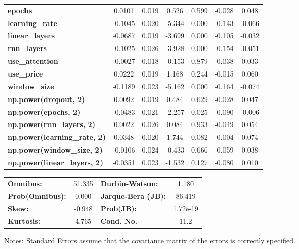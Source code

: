 \begin{center}
\begin{tabular}{lcccccc}
\textbf{epochs}                            &       0.0101  &        0.019     &     0.526  &         0.599        &       -0.028    &        0.048     \\
\textbf{learning\_rate}                    &      -0.1045  &        0.020     &    -5.344  &         0.000        &       -0.143    &       -0.066     \\
\textbf{linear\_layers}                    &      -0.0687  &        0.019     &    -3.699  &         0.000        &       -0.105    &       -0.032     \\
\textbf{rnn\_layers}                       &      -0.1025  &        0.026     &    -3.928  &         0.000        &       -0.154    &       -0.051     \\
\textbf{use\_attention}                    &      -0.0027  &        0.018     &    -0.153  &         0.879        &       -0.038    &        0.033     \\
\textbf{use\_price}                        &       0.0222  &        0.019     &     1.168  &         0.244        &       -0.015    &        0.060     \\
\textbf{window\_size}                      &      -0.1189  &        0.023     &    -5.162  &         0.000        &       -0.164    &       -0.074     \\
\textbf{np.power(dropout, 2)}              &       0.0092  &        0.019     &     0.484  &         0.629        &       -0.028    &        0.047     \\
\textbf{np.power(epochs, 2)}               &      -0.0483  &        0.021     &    -2.257  &         0.025        &       -0.090    &       -0.006     \\
\textbf{np.power(rnn\_layers, 2)}          &       0.0022  &        0.026     &     0.084  &         0.933        &       -0.049    &        0.054     \\
\textbf{np.power(learning\_rate, 2)}       &       0.0348  &        0.020     &     1.744  &         0.082        &       -0.004    &        0.074     \\
\textbf{np.power(window\_size, 2)}         &      -0.0106  &        0.024     &    -0.433  &         0.666        &       -0.059    &        0.038     \\
\textbf{np.power(linear\_layers, 2)}       &      -0.0351  &        0.023     &    -1.532  &         0.127        &       -0.080    &        0.010     \\
\bottomrule
\end{tabular}
\begin{tabular}{lclc}
\textbf{Omnibus:}       & 51.335 & \textbf{  Durbin-Watson:     } &    1.180  \\
\textbf{Prob(Omnibus):} &  0.000 & \textbf{  Jarque-Bera (JB):  } &   86.419  \\
\textbf{Skew:}          & -0.948 & \textbf{  Prob(JB):          } & 1.72e-19  \\
\textbf{Kurtosis:}      &  4.765 & \textbf{  Cond. No.          } &     11.2  \\
\bottomrule
\end{tabular}
\end{center}

Notes: \newline
 [1] Standard Errors assume that the covariance matrix of the errors is correctly specified.